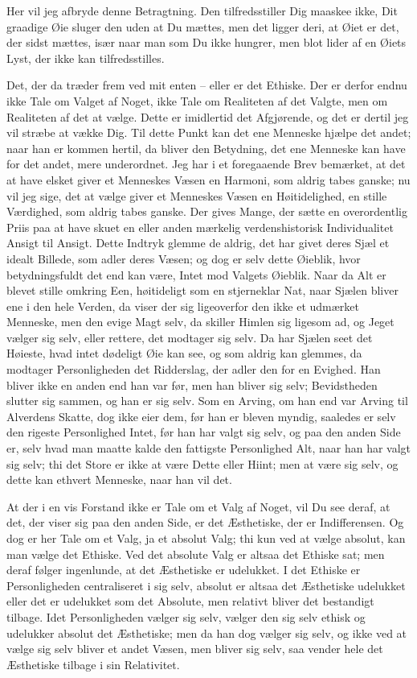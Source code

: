 \documentclass[12pt,a4paper]{article}
\begin{document}
Her vil jeg afbryde denne Betragtning. Den tilfredsstiller Dig maaskee ikke, Dit graadige Øie sluger den uden at Du mættes, men det ligger deri, at Øiet er det, der sidst mættes, især naar man som Du ikke hungrer, men blot lider af en Øiets Lyst, der ikke kan tilfredsstilles.

Det, der da træder frem ved mit enten – eller er det Ethiske. Der er derfor endnu ikke Tale om Valget af Noget, ikke Tale om Realiteten af det Valgte, men om Realiteten af det at vælge. Dette er imidlertid det Afgjørende, og det er dertil jeg vil stræbe at vække Dig. Til dette Punkt kan det ene Menneske hjælpe det andet; naar han er kommen hertil, da bliver den Betydning, det ene Menneske kan have for det andet, mere underordnet. Jeg har i et foregaaende Brev bemærket, at det at have elsket giver et Menneskes Væsen en Harmoni, som aldrig tabes ganske; nu vil jeg sige, det at vælge giver et Menneskes Væsen en Høitidelighed, en stille Værdighed, som aldrig tabes ganske. Der gives Mange, der sætte en overordentlig Priis paa at have skuet en eller anden mærkelig verdenshistorisk Individualitet Ansigt til Ansigt. Dette Indtryk glemme de aldrig, det har givet deres Sjæl et idealt Billede, som adler deres Væsen; og dog er selv dette Øieblik, hvor betydningsfuldt det end kan være, Intet mod Valgets Øieblik. Naar da Alt er blevet stille omkring Een, høitideligt som en stjerneklar Nat, naar Sjælen bliver ene i den hele Verden, da viser der sig ligeoverfor den ikke et udmærket Menneske, men den evige Magt selv, da skiller Himlen sig ligesom ad, og Jeget vælger sig selv, eller rettere, det modtager sig selv. Da har Sjælen seet det Høieste, hvad intet dødeligt Øie kan see, og som aldrig kan glemmes, da modtager Personligheden det Ridderslag, der adler den for en Evighed. Han bliver ikke en anden end han var før, men han bliver sig selv; Bevidstheden slutter sig sammen, og han er sig selv. Som en Arving, om han end var Arving til Alverdens Skatte, dog ikke eier dem, før han er bleven myndig, saaledes er selv den rigeste Personlighed Intet, før han har valgt sig selv, og paa den anden Side er, selv hvad man maatte kalde den fattigste Personlighed Alt, naar han har valgt sig selv; thi det Store er ikke at være Dette eller Hiint; men at være sig selv, og dette kan ethvert Menneske, naar han vil det.

At der i en vis Forstand ikke er Tale om et Valg af Noget, vil Du see deraf, at det, der viser sig paa den anden Side, er det Æsthetiske, der er Indifferensen. Og dog er her Tale om et Valg, ja et absolut Valg; thi kun ved at vælge absolut, kan man vælge det Ethiske. Ved det absolute Valg er altsaa det Ethiske sat; men deraf følger ingenlunde, at det Æsthetiske er udelukket. I det Ethiske er Personligheden centraliseret i sig selv, absolut er altsaa det Æsthetiske udelukket eller det er udelukket som det Absolute, men relativt bliver det bestandigt tilbage. Idet Personligheden vælger sig selv, vælger den sig selv ethisk og udelukker absolut det Æsthetiske; men da han dog vælger sig selv, og ikke ved at vælge sig selv bliver et andet Væsen, men bliver sig selv, saa vender hele det Æsthetiske tilbage i sin Relativitet.
\end{document}
